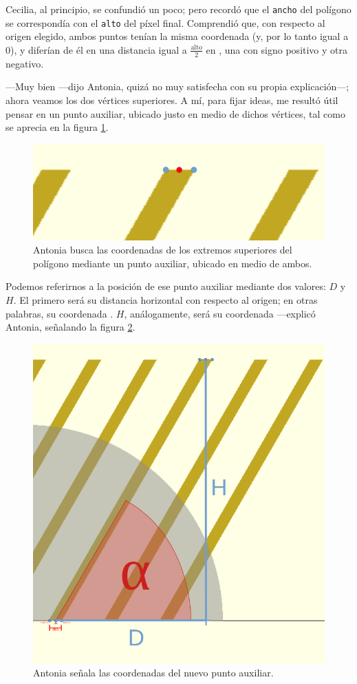 Cecilia, al principio, se confundió un poco; pero recordó que el
\texttt{ancho} del polígono se correspondía con el \texttt{alto} del
píxel final. Comprendió que, con respecto al origen elegido, ambos
puntos tenían la misma coordenada  (y, por lo tanto igual a
0), y diferían de él en una distancia igual a $\frac{\text{alto}}{2}$
en , una con signo positivo y otra negativo.

---Muy bien ---dijo Antonia, quizá no muy satisfecha con su propia
explicación---; ahora veamos los dos vértices superiores. A mí, para
fijar ideas, me resultó útil pensar en un punto auxiliar, ubicado
justo en medio de dichos vértices, tal como se aprecia en la figura
\ref{fig:poligono-punto-auxiliar}.
  

\begin{figure}[ht]
  \centering
  \includegraphics[width=.7\textwidth]{imagenes/poligono-punto-auxiliar}  
  \caption{Antonia busca las coordenadas de los extremos superiores
    del polígono mediante un punto auxiliar, ubicado en medio de
    ambos.}
  \label{fig:poligono-punto-auxiliar}
\end{figure}


\guillemotright Podemos referirnos a la posición de ese punto auxiliar
mediante dos valores: $D$ y $H$. El primero será su distancia
horizontal con respecto al origen; en otras palabras, su coordenada
. $H$, análogamente, será su coordenada 
---ex\-pli\-có Antonia, señalando la figura
\ref{fig:poligono-tangente}.

\begin{figure}[ht]
  \centering
  \includegraphics[width=.4\textwidth]{imagenes/poligono-tangente}
  \caption{Antonia señala las coordenadas del nuevo punto auxiliar.}
  \label{fig:poligono-tangente}
\end{figure}


